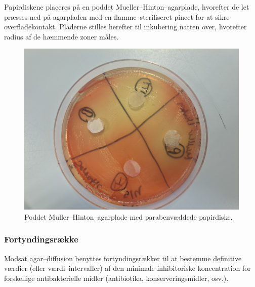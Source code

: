     Papirdiskene placeres på en poddet Mueller--Hinton--agarplade, hvorefter de let præsses ned på agarpladen med en flamme--steriliseret pincet for at sikre overfladekontakt. Pladerne stilles herefter til inkubering natten over, hvorefter radius af de hæmmende zoner måles.
    \begin{figure}[H]\centering
        \includegraphics[width=.75\linewidth]{billeder/mhplade}
        \caption{Poddet Muller--Hinton--agarplade med parabenvæddede papirdiske.}
    \end{figure}

    \subsubsection{Fortyndingsrække}
    Modsat agar--diffusion benyttes fortyndingsrækker til at bestemme definitive værdier (eller værdi--intervaller) af den minimale inhibitoriske koncentration for forskellige antibakterielle midler (antibiotika, konserveringsmidler, osv.). 


